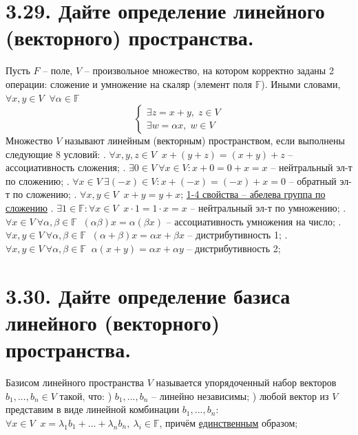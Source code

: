 \documentclass{article}
\begin{document}
\section*{\LARGE 3.29. Дайте определение линейного (векторного) пространства. }
Пусть $F$ -- поле, $V$ -- произвольное множество, на котором корректно заданы 2 операции: сложение и умножение на скаляр (элемент поля $\mathbb{F}$). Иными словами, $\forall x, y \in V \;\; \forall \alpha \in \mathbb{F}$
$$
\begin{cases}
\exists z = x + y, \; z \in V \\
\exists w = \alpha x, \; w \in V
\end{cases}
$$
Множество $V$ называют линейным (векторным) пространством, если выполнены следующие 8 условий:
\newline{}. $\forall x,y,z \in V \;\; x + (y + z) = (x + y) + z$ -- ассоциативность сложения;
\newline{}. $\exists 0 \in V\: \forall x \in V : x + 0 = 0 + x = x$ -- нейтральный эл-т по сложению;
\newline{}. $\forall x \in V \: \exists (-x) \in V : x + (-x) = (-x) + x = 0$ -- обратный эл-т по сложению;
\newline{}. $\forall x, y \in V \;\; x + y = y + x$;
\newline \underline{1-4 свойства -- абелева группа по сложению}
\newline{}. $\exists 1 \in \mathbb{F} : \forall x \in V \;\; x \cdot 1 = 1 \cdot x = x$ -- нейтральный эл-т по умножению;
\newline{}. $\forall x \in V \: \forall \alpha, \beta \in \mathbb{F} \;\; (\alpha\beta)x = \alpha(\beta x)$ -- ассоциативность умножения на число;
\newline{}. $\forall x, y \in V \: \forall \alpha, \beta \in \mathbb{F} \;\;(\alpha + \beta)x = \alpha x + \beta x$ -- дистрибутивность 1;
\newline{}. $\forall x, y \in V \: \forall \alpha, \beta \in \mathbb{F} \;\;\alpha(x + y) = \alpha x + \alpha y$ -- дистрибутивность 2;

\section*{\LARGE 3.30. Дайте определение базиса линейного (векторного) пространства. }
Базисом линейного пространства $V$ называется упорядоченный набор векторов $b_1, ..., b_n \in V$ такой, что:
\newline {}) $b_1, ..., b_n$ -- линейно независимы;
\newline {}) любой вектор из $V$ представим в виде линейной комбинации $b_1, ..., b_n$:
\newline\indent $\forall x \in V \;\; x = \lambda_1b_1 + ... + \lambda_nb_n,\: \lambda_i \in \mathbb{F}$, причём \underline{единственным} образом;
\end{document}
